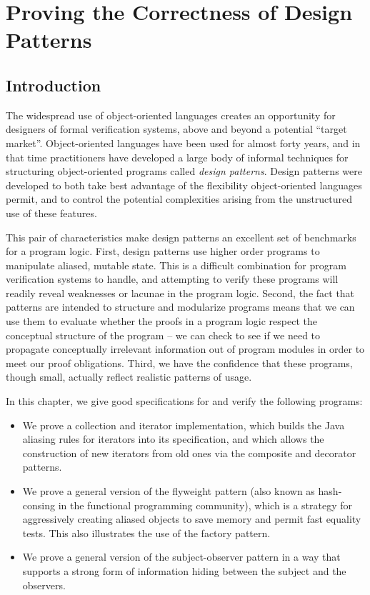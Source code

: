 \chapter{Proving the Correctness of Design Patterns}

\section{Introduction}

The widespread use of object-oriented languages creates an opportunity
for designers of formal verification systems, above and beyond a
potential ``target market''. Object-oriented languages have been used
for almost forty years, and in that time practitioners have developed
a large body of informal techniques for structuring object-oriented
programs called \emph{design patterns}\cite{GoF}.  Design patterns
were developed to both take best advantage of the flexibility
object-oriented languages permit, and to control the potential
complexities arising from the unstructured use of these features.

This pair of characteristics make design patterns an excellent set of
benchmarks for a program logic.  First, design patterns use higher
order programs to manipulate aliased, mutable state. This is a
difficult combination for program verification systems to handle, and
attempting to verify these programs will readily reveal weaknesses or
lacunae in the program logic. Second, the fact that patterns are
intended to structure and modularize programs means that we can use
them to evaluate whether the proofs in a program logic respect the
conceptual structure of the program -- we can check to see if we need
to propagate conceptually irrelevant information out of program
modules in order to meet our proof obligations. Third, we have the
confidence that these programs, though small, actually reflect
realistic patterns of usage.

In this chapter, we give good specifications for and verify the
following programs:

\begin{itemize}
\item We prove a collection and iterator implementation, which builds
  the Java aliasing rules for iterators into its specification, and
  which allows the construction of new iterators from old ones via the
  composite and decorator patterns.  

\item We prove a general version of the flyweight pattern (also known as
  hash-consing in the functional programming community), which is a
  strategy for aggressively creating aliased objects to save memory
  and permit fast equality tests. This also illustrates the use of the
  factory pattern.

\item We prove a general version of the subject-observer pattern in a
  way that supports a strong form of information hiding between the
  subject and the observers.
\end{itemize}

